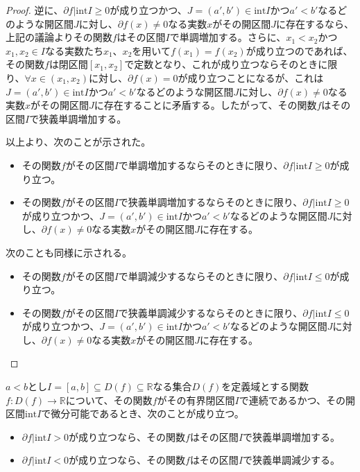 \documentclass[dvipdfmx]{jsarticle}
\begin{document}
\begin{proof}
逆に、$\partial f|\mathrm{int}I \geq 0$が成り立つかつ、$J = \left( a',b' \right) \in \mathrm{int}I$かつ$a' < b'$なるどのような開区間$J$に対し、$\partial f(x) \neq 0$なる実数$x$がその開区間$J$に存在するなら、上記の議論よりその関数$f$はその区間$I$で単調増加する。さらに、$x_{1} < x_{2}$かつ$x_{1},x_{2} \in I$なる実数たち$x_{1}$、$x_{2}$を用いて$f\left( x_{1} \right) = f\left( x_{2} \right)$が成り立つのであれば、その関数$f$は閉区間$\left[ x_{1},x_{2} \right]$で定数となり、これが成り立つならそのときに限り、$\forall x \in \left( x_{1},x_{2} \right)$に対し、$\partial f(x) = 0$が成り立つことになるが、これは$J = \left( a',b' \right) \in \mathrm{int}I$かつ$a' < b'$なるどのような開区間$J$に対し、$\partial f(x) \neq 0$なる実数$x$がその開区間$J$に存在することに矛盾する。したがって、その関数$f$はその区間$I$で狭義単調増加する。\par
以上より、次のことが示された。
\begin{itemize}
\item
  その関数$f$がその区間$I$で単調増加するならそのときに限り、$\partial f|\mathrm{int}I \geq 0$が成り立つ。
\item
  その関数$f$がその区間$I$で狭義単調増加するならそのときに限り、$\partial f|\mathrm{int}I \geq 0$が成り立つかつ、$J = \left( a',b' \right) \in \mathrm{int}I$かつ$a' < b'$なるどのような開区間$J$に対し、$\partial f(x) \neq 0$なる実数$x$がその開区間$J$に存在する。
\end{itemize}\par
次のことも同様に示される。
\begin{itemize}
\item
  その関数$f$がその区間$I$で単調減少するならそのときに限り、$\partial f|\mathrm{int}I \leq 0$が成り立つ。
\item
  その関数$f$がその区間$I$で狭義単調減少するならそのときに限り、$\partial f|\mathrm{int}I \leq 0$が成り立つかつ、$J = \left( a',b' \right) \in \mathrm{int}I$かつ$a' < b'$なるどのような開区間$J$に対し、$\partial f(x) \neq 0$なる実数$x$がその開区間$J$に存在する。
\end{itemize}
\end{proof}
\begin{thm}\label{4.2.2.7}
$a < b$とし$I = [ a,b] \subseteq D(f) \subseteq \mathbb{R}$なる集合$D(f)$を定義域とする関数$f:D(f) \rightarrow \mathbb{R}$について、その関数$f$がその有界閉区間$I$で連続であるかつ、その開区間$\mathrm{int}I$で微分可能であるとき、次のことが成り立つ。
\begin{itemize}
\item
  $\partial f|\mathrm{int}I > 0$が成り立つなら、その関数$f$はその区間$I$で狭義単調増加する。
\item
  $\partial f|\mathrm{int}I < 0$が成り立つなら、その関数$f$はその区間$I$で狭義単調減少する。
\end{itemize}
\end{thm}
\end{document}
